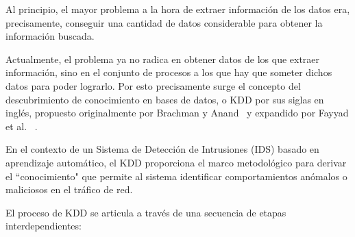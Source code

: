 Al principio, el mayor problema a la hora de extraer información de los datos era, precisamente, conseguir una cantidad de datos considerable para obtener la información buscada. 

Actualmente, el problema ya no radica en obtener datos de los que extraer información, sino en el conjunto de procesos a los que hay que someter dichos datos para poder lograrlo. Por esto precisamente surge el concepto del descubrimiento de conocimiento en bases de datos, o KDD por sus siglas en inglés, propuesto originalmente por Brachman y Anand~\cite{brachman1994process} y expandido por Fayyad et al. ~\cite{fayyad1996kdd}.

En el contexto de un Sistema de Detección de Intrusiones (IDS) basado en aprendizaje automático, el KDD proporciona el marco metodológico para derivar el ``conocimiento" que permite al sistema identificar comportamientos anómalos o maliciosos en el tráfico de red.

El proceso de KDD se articula a través de una secuencia de etapas interdependientes:

